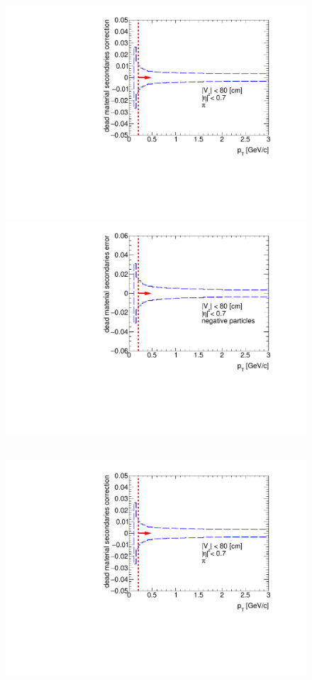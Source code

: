 \begin{figure}[hb]
{		\includegraphics[width=\linewidth,page=3]{graphics/systematicsEfficiency/deadMaterial/secondaries_Unbinned_SD_1D.pdf}\\
		\includegraphics[width=\linewidth,page=1]{graphics/systematicsEfficiency/deadMaterial/secondaries_Unbinned_Charged_SD1D.pdf}\\
	}~
	\parbox{0.495\textwidth}{
		\centering
		\includegraphics[width=\linewidth,page=4]{graphics/systematicsEfficiency/deadMaterial/secondaries_Unbinned_SD_1D.pdf}\\
}
\end{figure}
